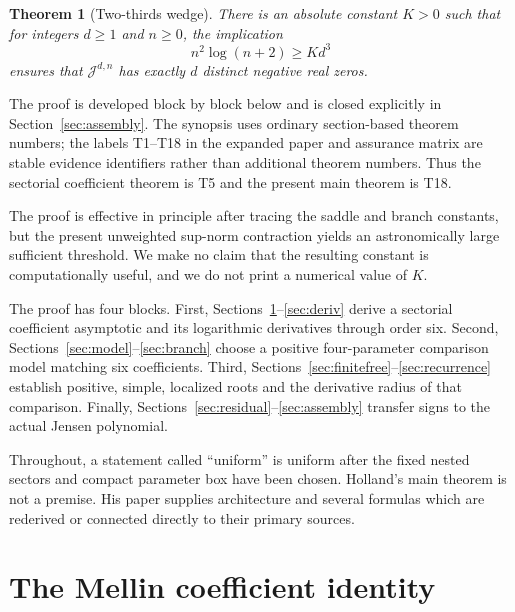 \documentclass[11pt]{article}
\newtheorem{theorem}{Theorem}[section]
\theoremstyle{definition}
\theoremstyle{remark}
\newcommand{\J}{\mathcal J}
\begin{document}
\begin{theorem}[Two-thirds wedge]\label{thm:main}
There is an absolute constant $K>0$ such that for integers $d\ge1$ and
$n\ge0$, the implication
\[
             n^2\log(n+2)\ge Kd^3
\]
ensures that $\J^{d,n}$ has exactly $d$ distinct negative real zeros.
\end{theorem}

The proof is developed block by block below and is closed explicitly in
Section~\ref{sec:assembly}.  The synopsis uses ordinary section-based theorem
numbers; the labels T1--T18 in the expanded paper and assurance matrix are
stable evidence identifiers rather than additional theorem numbers.  Thus
the sectorial coefficient theorem is T5 and the present main theorem is T18.

The proof is effective in principle after tracing the saddle and branch
constants, but the present unweighted sup-norm contraction yields an
astronomically large sufficient threshold.  We make no claim that the
resulting constant is computationally useful, and we do not print a
numerical value of $K$.

The proof has four blocks.  First, Sections~\ref{sec:mellin}--\ref{sec:deriv}
derive a sectorial coefficient asymptotic and its logarithmic derivatives
through order six.  Second, Sections~\ref{sec:model}--\ref{sec:branch} choose
a positive four-parameter comparison model matching six coefficients.
Third, Sections~\ref{sec:finitefree}--\ref{sec:recurrence} establish positive,
simple, localized roots and the derivative radius of that comparison.
Finally, Sections~\ref{sec:residual}--\ref{sec:assembly} transfer signs to the
actual Jensen polynomial.

Throughout, a statement called ``uniform'' is uniform after the fixed
nested sectors and compact parameter box have been chosen.  Holland's main
theorem is not a premise.  His paper supplies architecture and several
formulas which are rederived or connected directly to their primary
sources.

\section{The Mellin coefficient identity}\label{sec:mellin}
\end{document}
